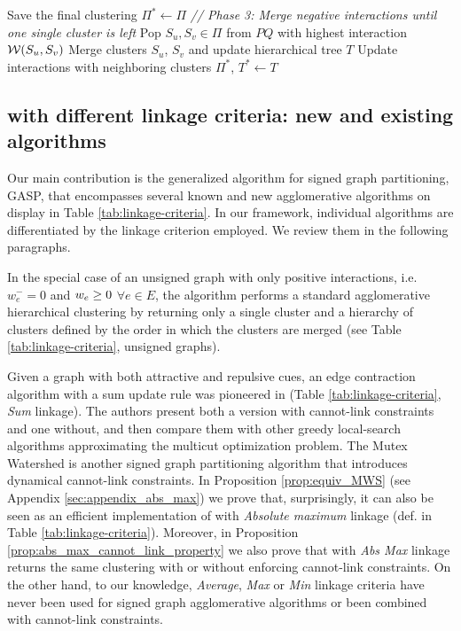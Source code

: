 \begin{algorithm}[t]
\begin{flushleft}
\begin{algorithmic}[1]
        \EndIf
      \State Save the final clustering $\Pi^* \gets \Pi$ 
      \State \emph{// Phase 3: Merge negative interactions until one single cluster is left}
      \Repeat
        \State Pop $S_u,S_v\in\Pi$ from $PQ$ with highest interaction $\mathcal{W}{}(S_u,S_v)$
        \State Merge clusters $S_u$, $S_v$ and update hierarchical tree $T$
        \State Update interactions with neighboring clusters
      \State
      \Return $\Pi^*$, $T^*\gets T$
  \end{algorithmic}
    \label{main_alg}
  \end{flushleft}

\end{algorithm}


\subsection{\algname{} with different linkage criteria: new and existing algorithms} \label{sec:alg_update_rules}

Our main contribution is the generalized algorithm for signed graph partitioning, GASP, that encompasses several known and new agglomerative algorithms on display in Table \ref{tab:linkage-criteria}.
In our framework, individual algorithms are differentiated by the linkage criterion employed. We review them in the following paragraphs.

In the special case of an unsigned graph with only positive interactions, i.e. $w_e^-=0$ and $w_e \geq 0$ $\forall e\in E$, 
 the algorithm performs a standard agglomerative hierarchical clustering by returning only a single cluster and a hierarchy of clusters defined by the order in which the clusters are merged (see Table \ref{tab:linkage-criteria}, unsigned graphs).

Given a graph with both attractive and repulsive cues, an edge contraction algorithm with a sum update rule was pioneered in \cite{levinkov2017comparative,keuper2015efficient} (Table \ref{tab:linkage-criteria}, \emph{Sum} linkage). The authors present both a version with cannot-link constraints and one without, and then compare them with other greedy local-search algorithms approximating the multicut optimization problem.
The Mutex Watershed \cite{wolf2018mutex} is another signed graph partitioning algorithm that introduces dynamical cannot-link constraints. In Proposition \ref{prop:equiv_MWS} (see Appendix \ref{sec:appendix_abs_max}) we prove that, surprisingly, it can also be seen as an efficient implementation of \algname{} with \emph{Absolute maximum} linkage (def. in Table \ref{tab:linkage-criteria}). Moreover, in Proposition \ref{prop:abs_max_cannot_link_property} we also prove that \algname{} with \emph{Abs Max} linkage returns the same clustering with or without enforcing cannot-link constraints.
On the other hand, to our knowledge, \emph{Average}, \emph{Max} or \emph{Min} linkage criteria have never been used for signed graph agglomerative algorithms or been combined with cannot-link constraints.

